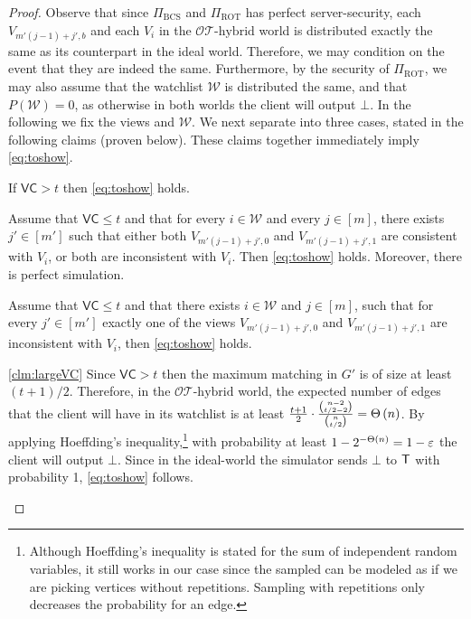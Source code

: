 \documentclass{llncs}
\newcommand{\OTfunc}{\mathcal{OT}}
\newcommand{\OThybrid}{\OTfunc\mbox{-}\text{hybrid}}
\newcommand{\ROT}{\operatorname{ROT}}
\newcommand{\stb}{\operatorname{BCS}}
\newcommand{\W}{\mathcal{W}}
\newcommand{\VC}{\mathsf{VC}}
\begin{document}
\begin{proof}
Observe that since $\Pi_{\stb}$ and $\Pi_{\ROT}$ has perfect server-security, each $V_{m'(j-1)+ j',b}$ and each $V_i$ in the $\OThybrid$ world is distributed exactly the same as its counterpart in the ideal world. Therefore, we may condition on the event that they are indeed the same. Furthermore, by the security of $\Pi_{\ROT}$, we may also assume that the watchlist $\W$ is distributed the same, and that $P(\W)=0$, as otherwise in both worlds the client will output $\bot$. In the following we fix the views and $\W$. We next separate into three cases, stated in the following claims (proven below). These claims together immediately imply \cref{eq:toshow}.

\begin{claim}\label{clm:largeVC}
If $\VC>t$ then \cref{eq:toshow} holds.
\end{claim}

\begin{claim}\label{clm:XNORconsistency}
Assume that $\VC\leq t$ and that for every $i\in\W$ and every $j\in[m]$, there exists $j'\in[m']$ such that either both $V_{m'(j-1)+j',0}$ and $V_{m'(j-1)+j',1}$ are consistent with $V_i$, or both are inconsistent with $V_i$. Then \cref{eq:toshow} holds. Moreover, there is perfect simulation.
\end{claim}

\begin{claim}\label{clm:XORconsistency}
Assume that $\VC\leq t$ and that there exists $i\in\W$ and $j\in[m]$, such that for every $j'\in[m']$ exactly one of the views $V_{m'(j-1)+j',0}$ and $V_{m'(j-1)+j',1}$ are inconsistent with $V_i$, then \cref{eq:toshow} holds. 
\end{claim}

\begin{proofof}{\cref{clm:largeVC}}
Since $\VC>t$ then the maximum matching in $G'$ is of size at least $(t+1)/2$. Therefore, in the $\OThybrid$ world, the expected number of edges that the client will have in its watchlist is at least $\frac{t+1}{2}\cdot\frac{\binom{n-2}{t/2-2}}{\binom{n}{t/2}}=\Theta\left ( n \right )$. By applying Hoeffding's inequality,\footnote{Although Hoeffding's inequality is stated for the sum of independent random variables, it still works in our case since the sampled can be modeled as if we are picking vertices without repetitions. Sampling with repetitions only decreases the probability for an edge.} with probability at least $1-2^{-\Theta\left ( n \right )}=1-\varepsilon$ the client will output $\bot$. Since in the ideal-world the simulator sends $\bot$ to $\mathsf{T}$ with probability 1, \cref{eq:toshow} follows.
\end{proofof}


\end{proof}
\end{document}
